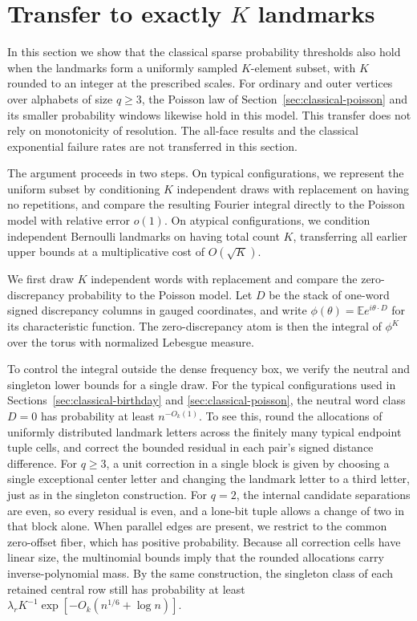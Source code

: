 \section{Transfer to exactly \(K\) landmarks}
\label{sec:fixed-cardinality}

In this section we show that the classical sparse probability thresholds also hold when the landmarks form a uniformly sampled \(K\)-element subset, with \(K\) rounded to an integer at the prescribed scales. For ordinary and outer vertices over alphabets of size \(q\ge3\), the Poisson law of Section~\ref{sec:classical-poisson} and its smaller probability windows likewise hold in this model. This transfer does not rely on monotonicity of resolution. The all-face results and the classical exponential failure rates are not transferred in this section.

The argument proceeds in two steps. On typical configurations, we represent the uniform subset by conditioning \(K\) independent draws with replacement on having no repetitions, and compare the resulting Fourier integral directly to the Poisson model with relative error \(o(1)\). On atypical configurations, we condition independent Bernoulli landmarks on having total count \(K\), transferring all earlier upper bounds at a multiplicative cost of \(O(\sqrt K)\).

We first draw \(K\) independent words with replacement and compare the zero-discrepancy probability to the Poisson model. Let \(D\) be the stack of one-word signed discrepancy columns in gauged coordinates, and write \(\phi(\theta)=\mathbb E e^{i\theta\cdot D}\) for its characteristic function. The zero-discrepancy atom is then the integral of \(\phi^K\) over the torus with normalized Lebesgue measure.

To control the integral outside the dense frequency box, we verify the neutral and singleton lower bounds for a single draw. For the typical configurations used in Sections~\ref{sec:classical-birthday} and \ref{sec:classical-poisson}, the neutral word class \(D=0\) has probability at least \(n^{-O_k(1)}\). To see this, round the allocations of uniformly distributed landmark letters across the finitely many typical endpoint tuple cells, and correct the bounded residual in each pair's signed distance difference. For \(q\ge3\), a unit correction in a single block is given by choosing a single exceptional center letter and changing the landmark letter to a third letter, just as in the singleton construction. For \(q=2\), the internal candidate separations are even, so every residual is even, and a lone-bit tuple allows a change of two in that block alone. When parallel edges are present, we restrict to the common zero-offset fiber, which has positive probability. Because all correction cells have linear size, the multinomial bounds imply that the rounded allocations carry inverse-polynomial mass. By the same construction, the singleton class of each retained central row still has probability at least \(\lambda_r K^{-1}\exp[-O_k(n^{1/6}+\log n)]\).


